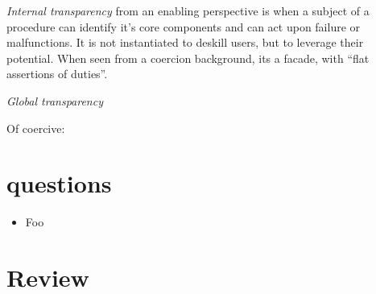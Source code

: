 \emph{Internal transparency} from an enabling perspective is when a subject of a procedure can identify it's core components and can act upon failure or malfunctions. 
It is not instantiated to deskill users, but to leverage their potential. 
When seen from a coercion background, its a facade, with ``flat assertions of duties''. 

\emph{Global transparency}



Of coercive: 

\section{questions}
\begin{itemize}
  \item Foo
\end{itemize}

\section{Review}
